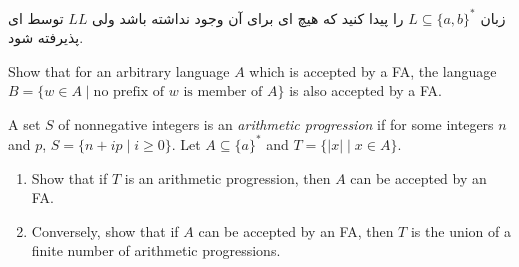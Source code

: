 \documentclass{article}
\newcommand*\circled[1]{
	\tikz[baseline=(char.base)]{
		\node[shape=circle,draw,inner sep=-1pt,color=red] (char) {\textcolor{black}{#1}\strut}
	}\kern-3pt
}
\let\oldlabelenumi=\labelenumi
\newcommand{\StartCircledEnumi}{\renewcommand{\labelenumi}{\circled{\oldlabelenumi}}}
\newcommand{\EndCircledEnumi}{\renewcommand{\labelenumi}{\oldlabelenumi}}
\newcommand{\CircledEnumi}{\StartCircledEnumi\item\EndCircledEnumi}
\begin{document}
\begin{enumerate}
	\item
	زبان
	$L \subseteq \{a,b\}^*$
	را پیدا کنید که هیچ ای برای آن وجود نداشته باشد ولی $LL$ توسط ای پذیرفته شود.
	\begin{latin}
		\item
		Show that for an arbitrary language $A$ which is accepted by a FA, the language $B = \{w \in A \; | \; \text{no prefix of $w$ is member of $A$}\}$ is also accepted by a FA.
		\CircledEnumi
		A set $S$ of nonnegative integers is an \textit{arithmetic progression} if for some integers $n$ and $p$, $S = \{n + ip \; | \; i \geq 0\}$. Let $A \subseteq \{a\}^*$ and $T = \{|x| \; | \; x \in A\}$. 
		\begin{enumerate}
			\item 
			Show that if $T$ is an arithmetic progression, then $A$ can be accepted by an FA.
			\item 
			Conversely, show that if $A$ can be accepted by an FA, then $T$ is the union of a finite number of arithmetic progressions.
		\end{enumerate} 
	\end{latin}
	
	
	
\end{enumerate}
\end{document}
